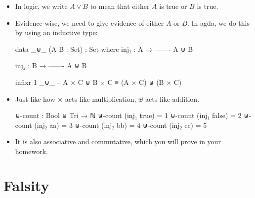 \documentclass{lecturenotes}
\begin{document}
\begin{itemize}
\item In logic, we write $A \lor B$ to mean that either $A$ is true or $B$ is true.
\item Evidence-wise, we need to give evidence of either $A$ or $B$.
  In agda, we do this by using an inductive type:
\begin{code}
data _⊎_ (A B : Set) : Set where
  inj₁ :
       A →
    -------
     A ⊎ B

  inj₂ :
       B →
    -------
     A ⊎ B

infixr 1 _⊎_ -- A × C ⊎ B × C ≡ (A × C) ⊎ (B × C)    
\end{code}
\item Just like how $\times$ acts like multiplication, $\uplus$ acts like addition.
\begin{code}
⊎-count : Bool ⊎ Tri → ℕ
⊎-count (inj₁ true)  = 1
⊎-count (inj₁ false) = 2
⊎-count (inj₂ aa)    = 3
⊎-count (inj₂ bb)    = 4
⊎-count (inj₂ cc)    = 5
\end{code}
\item It is also associative and commutative, which you will prove in your homework.
\end{itemize}

\section{Falsity}
\label{sec:falsity}
\end{document}
